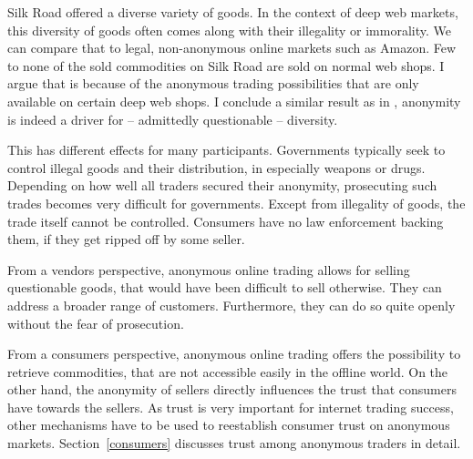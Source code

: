 Silk Road offered a diverse variety of goods. In the context of deep web markets, this diversity of goods often comes along with their illegality or immorality\cite{silkroad2013}. We can compare that to legal, non-anonymous online markets such as Amazon. Few to none of the sold commodities on Silk Road are sold on normal web shops. I argue that is because of the anonymous trading possibilities that are only available on certain deep web shops. I conclude a similar result as in \cite{accountability2014}, anonymity is indeed a driver for -- admittedly questionable -- diversity. 

This has different effects for many participants. Governments typically seek to control illegal goods and their distribution, in especially weapons or drugs. Depending on how well all traders secured their anonymity, prosecuting such trades becomes very difficult for governments. Except from illegality of goods, the trade itself cannot be controlled. Consumers have no law enforcement backing them, if they get ripped off by some seller.

From a vendors perspective, anonymous online trading allows for selling questionable goods, that would have been difficult to sell otherwise. They can address a broader range of customers. Furthermore, they can do so quite openly without the fear of prosecution.

From a consumers perspective, anonymous online trading offers the possibility to retrieve commodities, that are not accessible easily in the offline world. On the other hand, the anonymity of sellers directly influences the trust that consumers have towards the sellers. As trust is very important for internet trading success\cite{internetTrust2004}, other mechanisms  have to be used to reestablish consumer trust on anonymous markets. Section~\ref{consumers} discusses trust among anonymous traders in detail.
